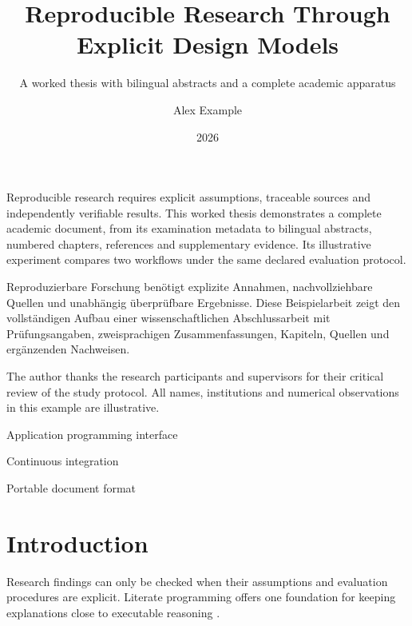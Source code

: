 \title{Reproducible Research Through Explicit Design Models}
\subtitle{A worked thesis with bilingual abstracts and a complete academic apparatus}
\author{Alex Example}
\date{2026}



\makethesistitle
\begin{Abstract}
Reproducible research requires explicit assumptions, traceable sources and independently verifiable results. This worked thesis demonstrates a complete academic document, from its examination metadata to bilingual abstracts, numbered chapters, references and supplementary evidence. Its illustrative experiment compares two workflows under the same declared evaluation protocol.
\end{Abstract}
\begin{Kurzfassung}
Reproduzierbare Forschung benötigt explizite Annahmen, nachvollziehbare Quellen und unabhängig überprüfbare Ergebnisse. Diese Beispielarbeit zeigt den vollständigen Aufbau einer wissenschaftlichen Abschlussarbeit mit Prüfungsangaben, zweisprachigen Zusammenfassungen, Kapiteln, Quellen und ergänzenden Nachweisen.
\end{Kurzfassung}
\begin{Acknowledgements}
The author thanks the research participants and supervisors for their critical review of the study protocol. All names, institutions and numerical observations in this example are illustrative.
\end{Acknowledgements}
\begin{Abbreviations}
  \item[API] Application programming interface
  \item[CI] Continuous integration
  \item[PDF] Portable document format
\end{Abbreviations}
\tableofcontents
\makemainmatter

\chapter{Introduction}
\label{chap:introduction}
Research findings can only be checked when their assumptions and evaluation procedures are explicit. Literate programming offers one foundation for keeping explanations close to executable reasoning \cite{knuth1984}.
